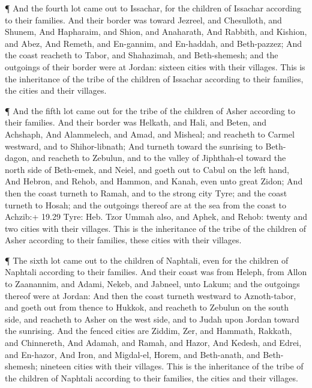  ¶ And the fourth lot came out to Issachar, for the
children of Issachar according to their families.  And
their border was toward Jezreel, and Chesulloth, and Shunem,
 And Hapharaim, and Shion, and Anaharath,  And
Rabbith, and Kishion, and Abez,  And Remeth, and En-gannim,
and En-haddah, and Beth-pazzez;  And the coast reacheth to
Tabor, and Shahazimah, and Beth-shemesh; and the outgoings of their
border were at Jordan: sixteen cities with their villages. 
This is the inheritance of the tribe of the children of Issachar
according to their families, the cities and their villages.

 ¶ And the fifth lot came out for the tribe of the children
of Asher according to their families.  And their border was
Helkath, and Hali, and Beten, and Achshaph,  And
Alammelech, and Amad, and Misheal; and reacheth to Carmel westward, and
to Shihor-libnath;  And turneth toward the sunrising to
Beth-dagon, and reacheth to Zebulun, and to the valley of Jiphthah-el
toward the north side of Beth-emek, and Neiel, and goeth out to Cabul on
the left hand,  And Hebron, and Rehob, and Hammon, and
Kanah, even unto great Zidon;  And then the coast turneth
to Ramah, and to the strong city Tyre; and the coast turneth to Hosah;
and the outgoings thereof are at the sea from the coast to Achzib:+
19.29 Tyre: Heb. Tzor  Ummah also, and Aphek, and Rehob:
twenty and two cities with their villages.  This is the
inheritance of the tribe of the children of Asher according to their
families, these cities with their villages.

 ¶ The sixth lot came out to the children of Naphtali, even
for the children of Naphtali according to their families. 
And their coast was from Heleph, from Allon to Zaanannim, and Adami,
Nekeb, and Jabneel, unto Lakum; and the outgoings thereof were at
Jordan:  And then the coast turneth westward to
Aznoth-tabor, and goeth out from thence to Hukkok, and reacheth to
Zebulun on the south side, and reacheth to Asher on the west side, and
to Judah upon Jordan toward the sunrising.  And the fenced
cities are Ziddim, Zer, and Hammath, Rakkath, and Chinnereth,
 And Adamah, and Ramah, and Hazor,  And
Kedesh, and Edrei, and En-hazor,  And Iron, and Migdal-el,
Horem, and Beth-anath, and Beth-shemesh; nineteen cities with their
villages.  This is the inheritance of the tribe of the
children of Naphtali according to their families, the cities and their
villages.

